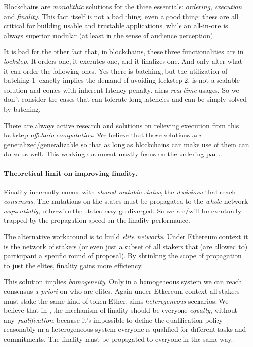 Blockchains are \emph{monolithic} solutions for the three essentials: \emph{ordering}, \emph{execution} and \emph{finality}.
This fact itself is not a bad thing, even a good thing: these are all critical for building usable and trustable applications, while an all-in-one is always superior modular (at least in the sense of audience perception).

It is bad for the other fact that, in blockchains, these three functionalities are in \emph{lockstep}.
It orders one, it executes one, and it finalizes one.
And only after what it can order the following ones.
Yes there is batching, but the utilization of batching 1. exactly implies the demand of avoiding lockstep 2. is not a scalable solution and comes with inherent latency penalty.
\sys aims \emph{real time} usages.
So we don't consider the cases that can tolerate long latencies and can be simply solved by batching.

There are always active research and solutions on relieving execution from this lockstep \ie \emph{offchain computation}.
We believe that those solutions are generalized/generalizable so that as long as blockchains can make use of them \sys can do so as well.
This working document mostly focus on the ordering part.

\paragraph{Theoretical limit on improving finality.}
Finality inherently comes with \emph{shared mutable states}, \ie the \emph{decisions} that reach \emph{consensus}.
The mutations on the states must be propagated to the \emph{whole} network \emph{sequentially}, otherwise the states may go diverged.
So we are/will be eventually trapped by the propagation speed on the finality performance.

The alternative workaround is to build \emph{elite networks}.
Under Ethereum context it is the network of stakers (or even just a subset of all stakers that (are allowed to) participant a specific round of proposal).
By shrinking the scope of propagation to just the elites, finality gains more efficiency.

This solution implies \emph{homogeneity}.
Only in a homogeneous system we can reach consensus \emph{a priori} on who are elites.
Again under Ethereum context all stakers must stake the same kind of token \ie Ether.
\sys aims \emph{heterogeneous} scenarios.
We believe that in \sys, the mechanism of finality should be everyone \emph{equally}, without any \emph{qualification}, because it's impossible to define the qualification policy reasonably in a heterogeneous system \ie everyone is qualified for different tasks and commitments.
The finality must be propagated to everyone in the same way.

